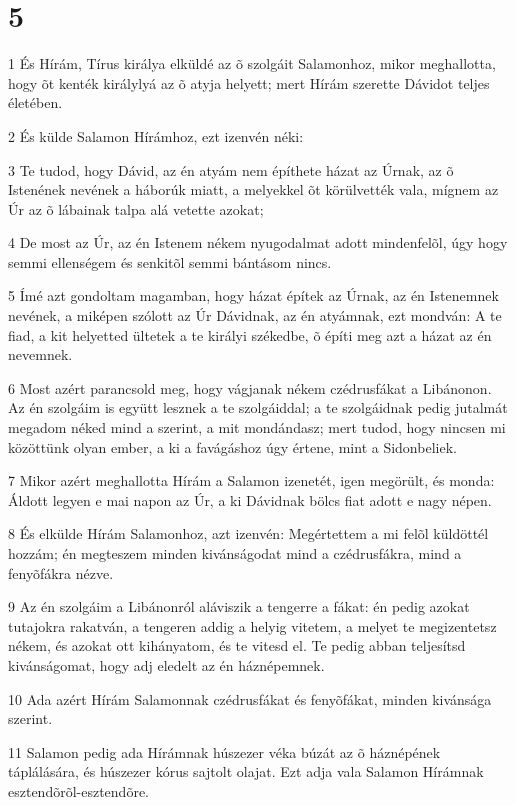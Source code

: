 \chapter{5}

\par 1 És Hírám, Tírus királya elküldé az õ szolgáit Salamonhoz, mikor meghallotta, hogy õt kenték királylyá az õ atyja helyett; mert Hírám szerette Dávidot teljes életében.
\par 2 És külde Salamon Hírámhoz, ezt izenvén néki:
\par 3 Te tudod, hogy Dávid, az én atyám nem építhete házat az Úrnak, az õ Istenének nevének a háborúk miatt, a melyekkel õt körülvették vala, mígnem az Úr az õ lábainak talpa alá vetette azokat;
\par 4 De most az Úr, az én Istenem nékem nyugodalmat adott mindenfelõl, úgy hogy semmi ellenségem és senkitõl semmi bántásom nincs.
\par 5 Ímé azt gondoltam magamban, hogy házat építek az Úrnak, az én Istenemnek nevének, a miképen szólott az Úr Dávidnak, az én atyámnak, ezt mondván: A te  fiad, a kit helyetted ültetek a te királyi székedbe, õ építi meg azt a házat az én nevemnek.
\par 6 Most azért parancsold meg, hogy vágjanak nékem czédrusfákat a Libánonon. Az én szolgáim is együtt lesznek a te szolgáiddal; a te szolgáidnak pedig jutalmát megadom néked mind a szerint, a mit mondándasz; mert tudod, hogy nincsen mi közöttünk olyan ember, a ki a favágáshoz úgy értene, mint a Sidonbeliek.
\par 7 Mikor azért meghallotta Hírám a Salamon izenetét, igen megörült, és monda: Áldott legyen e mai napon az Úr, a ki Dávidnak bölcs fiat adott e nagy népen.
\par 8 És elkülde Hírám Salamonhoz, azt izenvén: Megértettem a mi felõl küldöttél hozzám; én megteszem minden kivánságodat mind a czédrusfákra, mind a fenyõfákra nézve.
\par 9 Az én szolgáim a Libánonról aláviszik a tengerre a fákat: én pedig azokat tutajokra rakatván, a tengeren addig a helyig vitetem, a melyet te megizentetsz nékem, és azokat ott kihányatom, és te vitesd el. Te pedig abban teljesítsd kivánságomat, hogy adj eledelt az én háznépemnek.
\par 10 Ada azért Hírám Salamonnak czédrusfákat és fenyõfákat, minden kivánsága szerint.
\par 11 Salamon pedig ada Hírámnak húszezer véka búzát az õ háznépének táplálására, és húszezer kórus sajtolt olajat. Ezt adja vala Salamon Hírámnak esztendõrõl-esztendõre.
